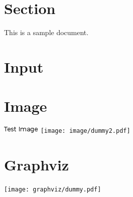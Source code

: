 \documentclass{article}
\begin{document}
\section{Section}
This is a sample document.

\section{Input}



\section{Image}
\includegraphics{image/dummy1.png}
\texttt{[image: image/dummy2.pdf]}

\section{Graphviz}
\texttt{[image: graphviz/dummy.pdf]}
\end{document}
